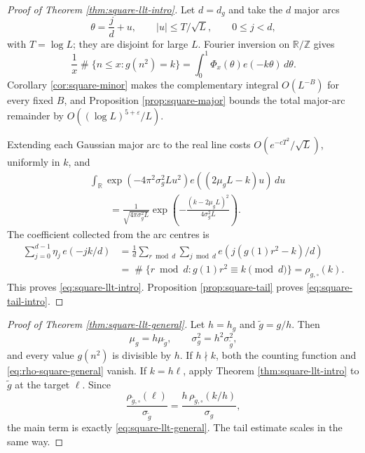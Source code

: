 \documentclass[11pt,reqno]{amsart}
\theoremstyle{plain}
\theoremstyle{definition}
\newcommand{\Z}{\mathbb{Z}}
\newcommand{\R}{\mathbb{R}}
\newcommand{\eps}{\varepsilon}
\newcommand{\ee}[1]{e\!\left(#1\right)}
\newcommand{\1}{\mathbf 1}
\DeclareMathOperator{\Card}{\#}
\begin{document}
\begin{proof}[Proof of Theorem \ref{thm:square-llt-intro}]
Let $d=d_g$ and take the $d$ major arcs
\[
 \theta=\frac jd+u,\qquad |u|\le T/\sqrt L,
 \qquad 0\le j<d,
\]
with $T=\log L$; they are disjoint for large $L$.  Fourier inversion on $\R/\Z$ gives
\begin{equation}\label{eq:square-inversion}
 \frac1x\Card\{n\le x:g(n^2)=k\}
 =\int_0^1\Phi_x(\theta)\ee{-k\theta}\,d\theta.
\end{equation}
Corollary \ref{cor:square-minor} makes the complementary integral $O(L^{-B})$ for every fixed $B$, and Proposition \ref{prop:square-major} bounds the total major-arc remainder by $O((\log L)^{5+\eps}/L)$.

Extending each Gaussian major arc to the real line costs $O(e^{-cT^2}/\sqrt L)$, uniformly in $k$, and
\begin{align*}
 &\int_{\R}\exp(-4\pi^2\sigma_g^2Lu^2)
 \ee{(2\mu_gL-k)u}\,du\\
 &\qquad=\frac1{\sqrt{4\pi\sigma_g^2L}}
 \exp\!\left(-\frac{(k-2\mu_gL)^2}{4\sigma_g^2L}\right).
\end{align*}
The coefficient collected from the arc centres is
\begin{equation}\label{eq:square-rho-fourier}
\begin{split}
 \sum_{j=0}^{d-1}\eta_j\,\ee{-jk/d}
 &=\frac1d\sum_{r\bmod d}\sum_{j\bmod d}
 \ee{j(g(1)r^2-k)/d}\\
 &=\Card\{r\bmod d:g(1)r^2\equiv k\pmod d\}
 =\rho_{g,\square}(k).
\end{split}
\end{equation}
This proves \eqref{eq:square-llt-intro}.  Proposition \ref{prop:square-tail} proves \eqref{eq:square-tail-intro}.
\end{proof}

\begin{proof}[Proof of Theorem \ref{thm:square-llt-general}]
Let $h=h_g$ and $\widetilde g=g/h$.  Then
\[
 \mu_g=h\mu_{\widetilde g},\qquad
 \sigma_g^2=h^2\sigma_{\widetilde g}^2,
\]
and every value $g(n^2)$ is divisible by $h$.  If $h\nmid k$, both the counting function and \eqref{eq:rho-square-general} vanish.  If $k=h\ell$, apply Theorem \ref{thm:square-llt-intro} to $\widetilde g$ at the target $\ell$.  Since
\[
 \frac{\rho_{\widetilde g,\square}(\ell)}{\sigma_{\widetilde g}}
 =\frac{h\,\rho_{\widetilde g,\square}(k/h)}{\sigma_g},
\]
the main term is exactly \eqref{eq:square-llt-general}.  The tail estimate scales in the same way.
\end{proof}
\end{document}
